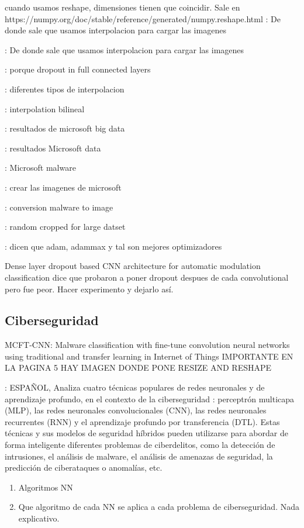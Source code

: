 \documentclass[11pt, a4paper]{article} %
\begin{document}
cuando usamos reshape, dimensiones tienen que coincidir. Sale en https://numpy.org/doc/stable/reference/generated/numpy.reshape.html
\citep{ni2018malware} : De donde sale que usamos interpolacion para cargar las imagenes

\citep{zhao2023new} : De donde sale que usamos interpolacion para cargar las imagenes

\citep{hinton2012improving} : porque dropout in full connected layers

\citep{zhao2023new} : diferentes tipos de interpolacion

\citep{he2019malware}: interpolation bilineal

\citep{gibert2019using} : resultados de microsoft big data

\citep{ni2018malware} : resultados Microsoft data

\citep{sharma2024migan} : Microsoft malware

\citep{kornish2018malware} : crear las imagenes de microsoft

\citep{luo2017binary} : conversion malware to image 

\citep{simonyan2014very} : random cropped for large datset


\citep{habibi2023performance} : dicen que adam, adammax y tal son mejores optimizadores

Dense layer dropout based CNN architecture for automatic modulation classification dice que probaron a poner dropout despues de cada convolutional pero fue peor. Hacer experimento y dejarlo así.


\subsection{Ciberseguridad}

MCFT-CNN: Malware classification with fine-tune convolution neural
networks using traditional and transfer learning in Internet of Things IMPORTANTE EN LA PAGINA 5 HAY IMAGEN DONDE PONE RESIZE AND RESHAPE

\cite{yagual2022revision} : ESPAÑOL, Analiza cuatro técnicas populares de redes neuronales y de aprendizaje profundo, en el contexto de la ciberseguridad : perceptrón multicapa (MLP), las redes neuronales convolucionales (CNN), las redes neuronales recurrentes (RNN) y el aprendizaje profundo por transferencia (DTL). Estas técnicas y sus modelos de seguridad híbridos pueden utilizarse para abordar de forma inteligente diferentes problemas de ciberdelitos, como la detección de intrusiones, el análisis de malware, el análisis de amenazas de seguridad, la predicción de ciberataques o anomalías, etc. 
\begin{enumerate}
\item Algoritmos NN
\item Que algoritmo de cada NN se aplica a cada problema de ciberseguridad. Nada explicativo.
\end{enumerate}
\end{document}

